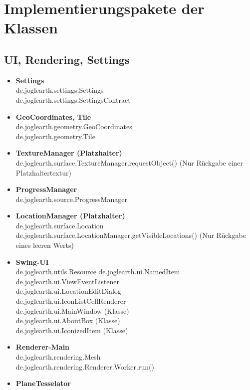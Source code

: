 \documentclass[10pt]{scrreprt}
\begin{document}
\vspace{2mm}

\section{Implementierungspakete der Klassen}
\subsection*{UI, Rendering, Settings}
\begin{itemize}
\item \textbf{Settings}\\
de.joglearth.settings.Settings\\
de.joglearth.settings.SettingsContract
\item \textbf{GeoCoordinates, Tile}\\
de.joglearth.geometry.GeoCoordinates\\
de.joglearth.geometry.Tile
\item \textbf{TextureManager (Platzhalter)}\\
de.joglearth.surface.TextureManager.requestObject() (Nur Rückgabe einer Platzhaltertextur)
\item \textbf{ProgressManager}\\
de.joglearth.source.ProgressManager
\item \textbf{LocationManager (Platzhalter)}\\
de.joglearth.surface.Location\\
de.joglearth.surface.LocationManager.getVisibleLocations() (Nur Rückgabe eines leeren Werts)
\item \textbf{Swing-UI}\\
de.joglearth.utils.Resource
de.joglearth.ui.NamedItem\\
de.joglearth.ui.ViewEventListener\\
de.joglearth.ui.LocationEditDialog\\
de.joglearth.ui.IconListCellRenderer\\
de.joglearth.ui.MainWindow (Klasse)\\
de.joglearth.ui.AboutBox (Klasse)\\
de.joglearth.ui.IconizedItem (Klasse)
\item \textbf{Renderer-Main}\\
de.joglearth.rendering.Mesh\\
de.joglearth.rendering.Renderer.Worker.run() 
\item \textbf{PlaneTesselator}\\

\end{itemize}
\end{document}
